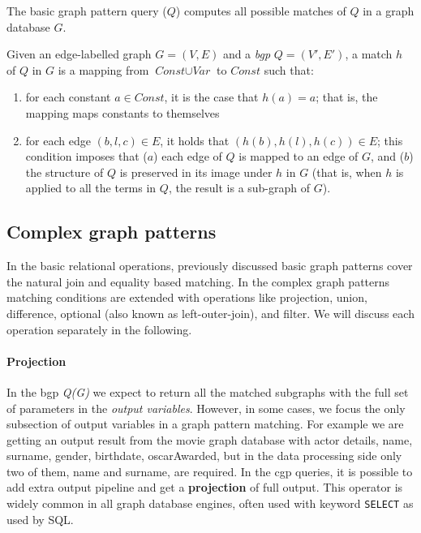 The basic graph pattern query ($Q$) computes all possible matches of $Q$ in a graph database $G$.

\begin{definition}[Match]\label{def:match}\cite{DBLP:journals/csur/AnglesABHRV17}
Given an edge-labelled graph $G = (V, E)$ and a \textit{bgp} $Q = (V', E')$, a match $h$ of $Q$ in $G$ is a mapping from $\textit{Const} \cup \textit{Var}$ to $\textit{Const}$ such that:

\begin{enumerate}
  \item for each constant $a \in \textit{Const}$, it is the case that $h(a) = a$; that is, the mapping maps constants
  to themselves
  \item for each edge $(b,l,c) \in E$, it holds that $(h(b),h(l),h(c)) \in E$; this condition imposes that
  ($a$) each edge of $Q$ is mapped to an edge of $G$, and ($b$) the structure of $Q$ is preserved in its
  image under $h$ in $G$ (that is, when $h$ is applied to all the terms in $Q$, the result is a sub-graph
  of $G$).
\end{enumerate}
\end{definition}

\subsection{Complex graph patterns}

In the basic relational operations, previously discussed basic graph patterns cover the natural join and equality based matching.
In the complex graph patterns matching conditions are extended with operations like projection, union, difference, optional (also known as  left-outer-join), and filter.
We will discuss each operation separately in the following.

\paragraph{Projection}

In the bgp \textit{Q(G)} we expect to return all the matched subgraphs with the full set of parameters in the \textit{output variables}.
However, in some cases, we focus the only subsection of output variables in a graph pattern matching.
For example we are getting an output result from the movie graph database with actor details, \textsf{name}, \textsf{surname}, \textsf{gender}, \textsf{birthdate}, \textsf{oscarAwarded}, but in the data processing side only two of them, \textsf{name} and \textsf{surname}, are required.
In the cgp queries, it is possible to add extra output pipeline and get a \textbf{projection} of full output.
This operator is widely common in all graph database engines, often used with keyword \texttt{SELECT} as used by \textmd{SQL}.


